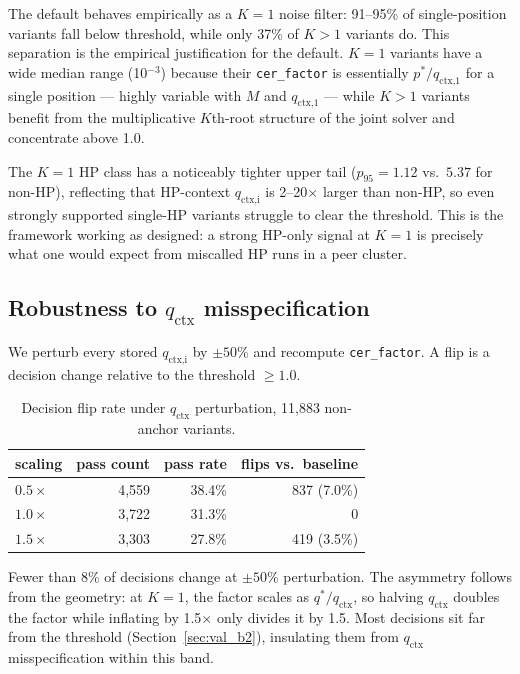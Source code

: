 \documentclass[11pt]{article}
\begin{document}
The default behaves empirically as a $K{=}1$ noise filter: 91--95\% of
single-position variants fall below threshold, while only 37\% of $K{>}1$
variants do. This separation is the empirical justification for the default.
$K{=}1$ variants have a wide median range (10$^{-3}$) because their
\texttt{cer\_factor} is essentially $p^*/q_\text{ctx,1}$ for a single
position --- highly variable with $M$ and $q_\text{ctx,1}$ ---
while $K{>}1$ variants benefit from the multiplicative $K$th-root structure
of the joint solver and concentrate above 1.0.

The $K{=}1$ HP class has a noticeably tighter upper tail ($p_{95} = 1.12$
vs.\ $5.37$ for non-HP), reflecting that HP-context $q_\text{ctx,i}$ is
2--20$\times$ larger than non-HP, so even strongly supported single-HP
variants struggle to clear the threshold. This is the framework working as
designed: a strong HP-only signal at $K{=}1$ is precisely what one would
expect from miscalled HP runs in a peer cluster.

\subsection{Robustness to $q_\text{ctx}$ misspecification}
\label{sec:val_b3}

We perturb every stored $q_\text{ctx,i}$ by $\pm 50\%$ and recompute
\texttt{cer\_factor}. A flip is a decision change relative to the
threshold $\geq\!1.0$.

\begin{table}[h]
\centering
\caption{Decision flip rate under $q_\text{ctx}$ perturbation, 11{,}883
non-anchor variants.}
\label{tab:val_sensitivity}
\begin{tabular}{l r r r}
\toprule
scaling      & pass count & pass rate & flips vs.\ baseline \\
\midrule
$0.5\times$  & 4{,}559    & 38.4\%    & 837 \quad (7.0\%) \\
$1.0\times$  & 3{,}722    & 31.3\%    & 0 \\
$1.5\times$  & 3{,}303    & 27.8\%    & 419 \quad (3.5\%) \\
\bottomrule
\end{tabular}
\end{table}

Fewer than 8\% of decisions change at $\pm 50\%$ perturbation. The
asymmetry follows from the geometry: at $K{=}1$, the factor scales as
$q^*/q_\text{ctx}$, so halving $q_\text{ctx}$ doubles the factor while
inflating by 1.5$\times$ only divides it by 1.5. Most decisions sit far
from the threshold (Section~\ref{sec:val_b2}), insulating them from
$q_\text{ctx}$ misspecification within this band.
\end{document}
